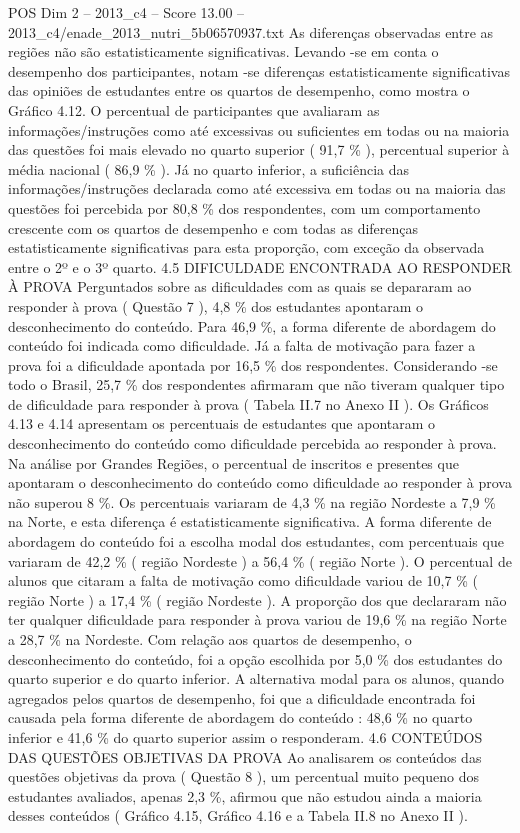 \begin{textsample}{POS Dim 2 – 2013\_c4 – Score 13.00 – 2013\_c4/enade\_2013\_nutri\_5b06570937.txt}
As diferenças observadas entre as regiões não são estatisticamente significativas.
Levando -se em conta o desempenho dos participantes, notam -se diferenças estatisticamente significativas das opiniões de estudantes entre os quartos de desempenho, como mostra o Gráfico 4.12.
O percentual de participantes que avaliaram as informações/instruções como até excessivas ou suficientes em todas ou na maioria das questões foi mais elevado no quarto superior ( 91,7 \% ), percentual superior à média nacional ( 86,9 \% ).
Já no quarto inferior, a suficiência das informações/instruções declarada como até excessiva em todas ou na maioria das questões foi percebida por 80,8 \% dos respondentes, com um comportamento crescente com os quartos de desempenho e com todas as diferenças estatisticamente significativas para esta proporção, com exceção da observada entre o 2º e o 3º quarto. 4.5 DIFICULDADE ENCONTRADA AO RESPONDER À PROVA Perguntados sobre as dificuldades com as quais se depararam ao responder à prova ( Questão 7 ), 4,8 \% dos estudantes apontaram o desconhecimento do conteúdo.
Para 46,9 \%, a forma diferente de abordagem do conteúdo foi indicada como dificuldade.
Já a falta de motivação para fazer a prova foi a dificuldade apontada por 16,5 \% dos respondentes.
Considerando -se todo o Brasil, 25,7 \% dos respondentes afirmaram que não tiveram qualquer tipo de dificuldade para responder à prova ( Tabela II.7 no Anexo II ).
Os Gráficos 4.13 e 4.14 apresentam os percentuais de estudantes que apontaram o desconhecimento do conteúdo como dificuldade percebida ao responder à prova.
Na análise por Grandes Regiões, o percentual de inscritos e presentes que apontaram o desconhecimento do conteúdo como dificuldade ao responder à prova não superou 8 \%.
Os percentuais variaram de 4,3 \% na região Nordeste a 7,9 \% na Norte, e esta diferença é estatisticamente significativa.
A forma diferente de abordagem do conteúdo foi a escolha modal dos estudantes, com percentuais que variaram de 42,2 \% ( região Nordeste ) a 56,4 \% ( região Norte ).
O percentual de alunos que citaram a falta de motivação como dificuldade variou de 10,7 \% ( região Norte ) a 17,4 \% ( região Nordeste ).
A proporção dos que declararam não ter qualquer dificuldade para responder à prova variou de 19,6 \% na região Norte a 28,7 \% na Nordeste.
Com relação aos quartos de desempenho, o desconhecimento do conteúdo, foi a opção escolhida por 5,0 \% dos estudantes do quarto superior e do quarto inferior.
A alternativa modal para os alunos, quando agregados pelos quartos de desempenho, foi que a dificuldade encontrada foi causada pela forma diferente de abordagem do conteúdo : 48,6 \% no quarto inferior e 41,6 \% do quarto superior assim o responderam. 4.6 CONTEÚDOS DAS QUESTÕES OBJETIVAS DA PROVA Ao analisarem os conteúdos das questões objetivas da prova ( Questão 8 ), um percentual muito pequeno dos estudantes avaliados, apenas 2,3 \%, afirmou que não estudou ainda a maioria desses conteúdos ( Gráfico 4.15, Gráfico 4.16 e a Tabela II.8 no Anexo II ).

\end{textsample}

